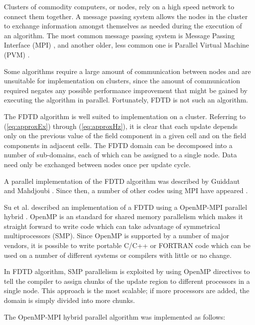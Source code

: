 \documentclass{acesconference}
\begin{document}
Clusters of commodity computers, or nodes, rely on a high speed
network to connect them together. A message passing system allows the
nodes in the cluster to exchange information amongst themselves as
needed during the execution of an algorithm. The most common message
passing system is Message Passing Interface (MPI) \cite{}, and another
older, less common one is Parallel Virtual Machine (PVM) \cite{}.

Some algorithms require a large amount of communication between nodes
and are unsuitable for implementation on clusters, since the amount of
communication required negates any possible performance improvement
that might be gained by executing the algorithm in parallel.
Fortunately, FDTD is not such an algorithm.

The FDTD algorithm is well suited to implementation on a
cluster. Referring to (\ref{eq:approxEx}) through (\ref{eq:approxHz}),
it is clear that each update depends only on the previous value of the
field component in a given cell and on the field components in
adjacent cells. The FDTD domain can be decomposed into a number of
sub-domains, each of which can be assigned to a single node. Data need
only be exchanged between nodes once per update cycle. 

A parallel implementation of the FDTD algorithm was described by
Guiddaut and Mahdjoubi \cite{guiffaut2001}. Since then, a number of
other codes using MPI have appeared \cite{}. 

Su et al. described an implementation of a FDTD using a OpenMP-MPI
parallel hybrid \cite{su2004}. OpenMP is an standard for shared memory
parallelism which makes it straight forward to write code which can
take advantage of symmetrical multiprocessors (SMP). Since OpenMP is
supported by a number of major vendors, it is possible to write
portable C/C++ or FORTRAN code which can be used on a number of
different systems or compilers with little or no change. 

In FDTD algorithm, SMP parallelism is exploited by using OpenMP
directives to tell the compiler to assign chunks of the update region
to different processors in a single node. This approach is the most
scalable; if more processors are added, the domain is simply divided
into more chunks.

The OpenMP-MPI hybrid parallel algorithm was implemented as follows:
\end{document}

